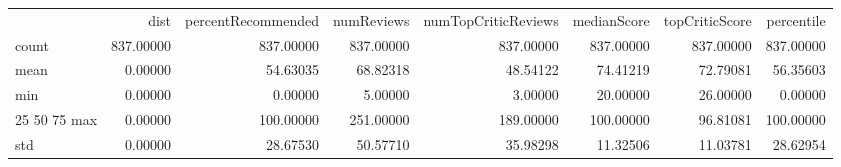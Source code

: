 \begin{tabular}{lrrrrrrr}
 & dist & percentRecommended & numReviews & numTopCriticReviews & medianScore & topCriticScore & percentile \\
count & 837.00000 & 837.00000 & 837.00000 & 837.00000 & 837.00000 & 837.00000 & 837.00000 \\
mean & 0.00000 & 54.63035 & 68.82318 & 48.54122 & 74.41219 & 72.79081 & 56.35603 \\
min & 0.00000 & 0.00000 & 5.00000 & 3.00000 & 20.00000 & 26.00000 & 0.00000 \\
25%
50%
75%
max & 0.00000 & 100.00000 & 251.00000 & 189.00000 & 100.00000 & 96.81081 & 100.00000 \\
std & 0.00000 & 28.67530 & 50.57710 & 35.98298 & 11.32506 & 11.03781 & 28.62954 \\
\end{tabular}

